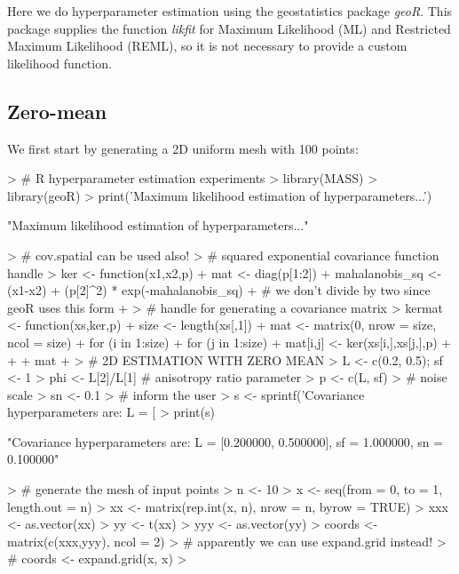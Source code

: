 \documentclass[a4paper]{article}
\begin{document}
Here we do hyperparameter estimation using the geostatistics package \emph{geoR}. This package supplies the function \emph{likfit} for Maximum Likelihood (ML) and Restricted Maximum Likelihood (REML), so it is not necessary to provide a custom likelihood function.

\subsection{Zero-mean}
We first start by generating a 2D uniform mesh with 100 points:

\begin{Schunk}
\begin{Sinput}
> # R hyperparameter estimation experiments
> library(MASS)
> library(geoR)
> print('Maximum likelihood estimation of hyperparameters...')
\end{Sinput}
\begin{Soutput}
[1] "Maximum likelihood estimation of hyperparameters..."
\end{Soutput}
\begin{Sinput}
> # cov.spatial can be used also!
> # squared exponential covariance function handle
> ker <- function(x1,x2,p) {
+ 	mat <- diag(p[1:2])
+ 	mahalanobis_sq <- (x1-x2) %*% solve(mat,x1-x2)
+ 	(p[2]^2) * exp(-mahalanobis_sq) 
+ 	# we don't divide by two since geoR uses this form
+ }
> # handle for generating a covariance matrix
> kermat <- function(xs,ker,p) {
+ 	size <- length(xs[,1])
+ 	mat <- matrix(0, nrow = size, ncol = size)
+ 	for (i in 1:size) {
+ 		for (j in 1:size) {
+ 			mat[i,j] <- ker(xs[i,],xs[j,],p)
+ 		}
+ 	}
+ 	mat
+ }
> # 2D ESTIMATION WITH ZERO MEAN
> L <- c(0.2, 0.5); sf <- 1
> phi <- L[2]/L[1] # anisotropy ratio parameter 
> p <- c(L, sf)
> # noise scale
> sn <- 0.1
> # inform the user
> s <- sprintf('Covariance hyperparameters are: L = [%f, %f], sf = %f, sn = %f', L[1], L[2], sf, sn)
> print(s)
\end{Sinput}
\begin{Soutput}
[1] "Covariance hyperparameters are: L = [0.200000, 0.500000], sf = 1.000000, sn = 0.100000"
\end{Soutput}
\begin{Sinput}
> # generate the mesh of input points
> n <- 10
> x <- seq(from = 0, to = 1, length.out = n)
> xx <- matrix(rep.int(x, n), nrow = n, byrow = TRUE)
> xxx <- as.vector(xx)
> yy <- t(xx)
> yyy <- as.vector(yy)
> coords <- matrix(c(xxx,yyy), ncol = 2)
> # apparently we can use expand.grid instead!
> # coords <- expand.grid(x, x)
> 
\end{Sinput}
\end{Schunk}
\end{document}
